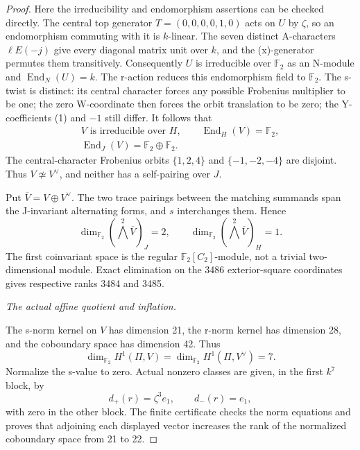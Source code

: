 \begin{proof}
Here the irreducibility and endomorphism assertions
can be checked directly. The central top generator
\(T=(0,0,0,0,1,0)\) acts on \(U\) by \(\zeta\),
so an endomorphism commuting with it is \(k\)-linear.
The seven distinct A-characters
\(\ell E(-j)\) give every diagonal matrix unit
over \(k\), and the (x)-generator permutes them
transitively. Consequently \(U\) is irreducible
over \(\mathbb F_2\) as an N-module and
\(\operatorname{End}_N(U)=k\). The r-action
reduces this endomorphism field to \(\mathbb F_2\).
The s-twist is distinct: its central character
forces any possible Frobenius multiplier to be one;
the zero W-coordinate then forces the orbit
translation to be zero; the Y-coefficients (1)
and \(-1\) still differ. It follows that
\[
\begin{gathered}
 V\text{ is irreducible over }H,\qquad
 \operatorname{End}_H(V)=\mathbb F_2,\\
 \operatorname{End}_J(V)=\mathbb F_2\oplus\mathbb F_2.
\end{gathered}
\]
The central-character Frobenius orbits
\(\{1,2,4\}\) and \(\{-1,-2,-4\}\) are disjoint.
Thus \(V\not\simeq V^\vee\), and neither has
a self-pairing over \(J\).

Put \(\overline V=V\oplus V^\vee\).
The two trace pairings between the matching
summands span the J-invariant alternating forms,
and \(s\) interchanges them. Hence
\[
 \dim_{\mathbb F_2}(\textstyle\bigwedge^2\overline V)_J=2,
 \qquad
 \dim_{\mathbb F_2}(\textstyle\bigwedge^2\overline V)_H=1.
                                                               \tag{A.51.4}
\]
The first coinvariant space is the regular
\(\mathbb F_2[C_2]\)-module, not a trivial
two-dimensional module. Exact elimination on the
3486 exterior-square coordinates gives respective
ranks 3484 and 3485.

\emph{The actual affine quotient and inflation.}\par
The s-norm kernel on \(V\) has dimension 21,
the r-norm kernel has dimension 28, and the
coboundary space has dimension 42. Thus
\[
 \dim_{\mathbb F_2}H^1(\Pi,V)
  =\dim_{\mathbb F_2}H^1(\Pi,V^\vee)=7.
                                                               \tag{A.51.5}
\]
Normalize the s-value to zero. Actual nonzero
classes are given, in the first \(k^7\) block, by
\[
 d_+(r)=\zeta^3e_1,\qquad d_-(r)=e_1,
                                                               \tag{A.51.6}
\]
with zero in the other block. The finite certificate
checks the norm equations and proves that adjoining
each displayed vector increases the rank of the
normalized coboundary space from 21 to 22.


\end{proof}
